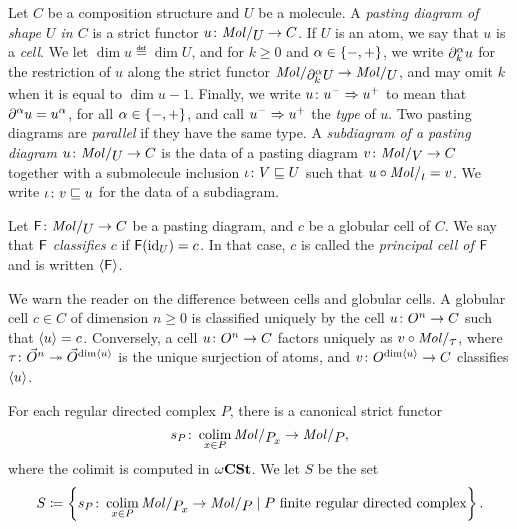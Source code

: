 \begin{dfn} 
    Let \( C \) be a composition structure and \( U \) be a molecule.
    A \emph{pasting diagram of shape \( U \) in \( C \)} is a strict functor \( u \colon \molecin{U} \to C \).
    If \( U \) is an atom, we say that \( u \) is a \emph{cell}.
    We let \( \dim u \eqdef \dim U \), and for \( k \geq 0 \) and \( \alpha \in \left\{ {-, +} \right\} \), we write \( \partial_{k}^{\alpha} u \) for the restriction of \( u \) along the strict functor \( \molecin{\bd{k}{\a} U} \to \molecin{U} \), and may omit \( k \) when it is equal to \( \dim u - 1 \).
    Finally, we write \( u \colon u^- \Rightarrow u^+ \) to mean that \( \partial_{}^{\alpha} u = u^\alpha \), for all \( \alpha \in \left\{ {-, +} \right\} \), and call \( u^- \Rightarrow u^+ \) the \emph{type} of \( u \).
    Two pasting diagrams are \emph{parallel} if they have the same type.
    A \emph{subdiagram of a pasting diagram \( u \colon \molecin{U} \to C \)} is the data of a pasting diagram \( v \colon \molecin{V} \to C \) together with a submolecule inclusion \( \iota \colon V \sqsubseteq U \) such that \( u \after \molecin{\iota} = v \).
    We write \( \iota \colon v \sqsubseteq u \) for the data of a subdiagram.
\end{dfn}

\begin{dfn} 
    Let \( \F \colon \molecin{U} \to C \) be a pasting diagram, and \( c \) be a globular cell of \( C \).
    We say that \emph{\( \mathsf{F} \) classifies \( c \)} if \( \mathsf{F}(\mathrm{id}_{U}) = c \).
    In that case, \( c \) is called the \emph{principal cell of \( \mathsf{F} \)} and is written \( \langle\mathsf{F}\rangle \).
\end{dfn}

\begin{comm}
    We warn the reader on the difference between cells and globular cells. 
    A globular cell \( c \in C \) of dimension \( n \geq 0 \) is classified uniquely by the cell \( u \colon O^{n} \to C \) such that \( \langle u\rangle = c \).
    Conversely, a cell \( u \colon O^{n} \to C \) factors uniquely as \( v \after \molecin{\tau} \), where \( \tau \colon \vec{O}^{n} \twoheadrightarrow \vec{O}^{\dim \langle u\rangle} \) is the unique surjection of atoms, and \( v \colon O^{\dim \langle u\rangle} \to C \) classifies \( \langle u\rangle \).
\end{comm}

\begin{dfn}
    For each regular directed complex \( P \), there is a canonical strict functor
    \begin{equation*}
        s_P \colon \colim_{x \in P} \molecin{\imel{P}{x}} \to \molecin{P},
    \end{equation*}
    where the colimit is computed in \( \omega\mathbf{CSt} \).
    We let \( S \) be the set
    \begin{equation*}
        S \eqdef \set{s_P \colon \colim_{x \in P} \molecin{\imel{P}{x}} \to \molecin{P} \mid P \text{ finite regular directed complex}}.
    \end{equation*}
\end{dfn}


